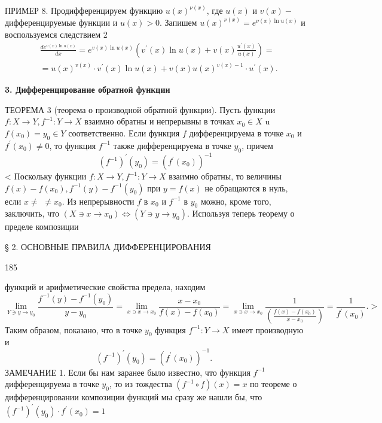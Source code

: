 \documentclass{article}
\begin{document}
ПРИМЕР 8. Продифференцируем функцию $u(x)^{\nu(x)}$, где $u(x)$ и $v(x)-$ дифференцируемые функции и $u(x)>0$. Запишем $u(x)^{\nu(x)}=e^{\nu(x) \ln u(x)}$ и воспользуемся следствием 2
$$
\begin{aligned}
& \frac{d e^{v(x) \ln u(x)}}{d x}=e^{v(x) \ln u(x)}\left(v^{\prime}(x) \ln u(x)+v(x) \frac{u^{\prime}(x)}{u(x)}\right)= \\
&=u(x)^{v(x)} \cdot v^{\prime}(x) \ln u(x)+v(x) u(x)^{v(x)-1} \cdot u^{\prime}(x) .
\end{aligned}
$$

\textbf{3. Дифференцирование обратной функции}

ТЕОРЕМА 3 (теорема о производной обратной функции). Пусть функции $f: X \rightarrow Y, f^{-1}: Y \rightarrow X$ взаимно обратны и непрерывны в точках $x_0 \in X$ u $f\left(x_0\right)=y_0 \in Y$ соответственно. Если функция $f$ дифференцируема в точке $x_0$ и $f^{\prime}\left(x_0\right) \neq 0$, то функция $f^{-1}$ также дифференцируема в точке $y_0$, причем
$$
\left(f^{-1}\right)^{\prime}\left(y_0\right)=\left(f^{\prime}\left(x_0\right)\right)^{-1}
$$
< Поскольку функции $f: X \rightarrow Y, f^{-1}: Y \rightarrow X$ взаимно обратны, то величины $f(x)-f\left(x_0\right), f^{-1}(y)-f^{-1}\left(y_0\right)$ при $y=f(x)$ не обращаются в нуль, если $x \neq$ $\neq x_0$. Из непрерывности $f$ в $x_0$ и $f^{-1}$ в $y_0$ можно, кроме того, заключить, что $\left(X \ni x \rightarrow x_0\right) \Leftrightarrow\left(Y \ni y \rightarrow y_0\right)$. Используя теперь теорему о пределе композиции


\newpage
\thispagestyle{empty}

\begin{scriptsize}§ 2. ОСНОВНЫЕ ПРАВИЛА ДИФФЕРЕНЦИРОВАНИЯ  \end{scriptsize} \mbox{}\hfill 185

\bigskip
функций и арифметические свойства предела, находим
$$
\lim _{Y \ni y \rightarrow y_0} \frac{f^{-1}(y)-f^{-1}\left(y_0\right)}{y-y_0}=\lim _{x \ni x \rightarrow x_0} \frac{x-x_0}{f(x)-f\left(x_0\right)}=\lim _{x \ni x \rightarrow x_0} \frac{1}{\left(\frac{f(x)-f\left(x_0\right)}{x-x_0}\right)}=\frac{1}{f^{\prime}\left(x_0\right)} . >
$$
Таким образом, показано, что в точке $y_0$ функция $f^{-1}: Y \rightarrow X$ имеет производную и
$$
\left(f^{-1}\right)^{\prime}\left(y_0\right)=\left(f^{\prime}\left(x_0\right)\right)^{-1} \text {. }
$$
ЗАМЕЧАНИЕ 1. Если бы нам заранее было известно, что функция $f^{-1}$ дифференцируема в точке $y_0$, то из тождества $\left(f^{-1} \circ f\right)(x)=x$ по теореме о дифференцировании композиции функций мы сразу же нашли бы, что $\left(f^{-1}\right)^{\prime}\left(y_0\right) \cdot f^{\prime}\left(x_0\right)=1$
\end{document}
